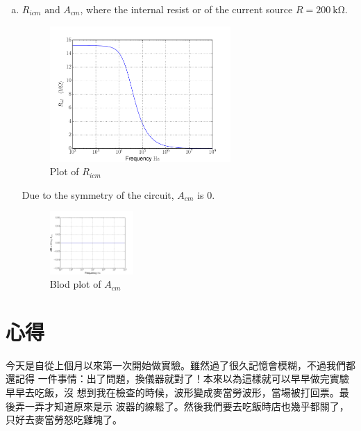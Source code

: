 \documentclass[12pt, a4paper]{article}
\begin{document}
\begin{enumerate}[itemsep=20pt, topsep=10pt]
\begin{enumerate}[(a)]
      \item $R_{icm} \text{ and } A_{cm}$, where the internal resist or of the current source $R=\SI{200}\kohm$.
        \begin{figure}[H]
          \centering
          \includegraphics[width=0.65\textwidth]{ngspice/acmr200_r.pdf}
          \caption{Plot of $R_{icm}$}
          \label{fig:}
        \end{figure}
        Due to the symmetry of the circuit, $A_{cm}$ is $0$.
        \begin{figure}[H]
          \centering
          \includegraphics[width=0.3\textwidth]{ngspice/acmr200_db.pdf}
          \caption{Blod plot of $A_{cm}$}
          \label{fig:}
        \end{figure}
    \end{enumerate}
\end{enumerate}

\section{心得}
今天是自從上個月以來第一次開始做實驗。雖然過了很久記憶會模糊，不過我們都還記得
一件事情：出了問題，換儀器就對了！本來以為這樣就可以早早做完實驗早早去吃飯，沒
想到我在檢查的時候，波形變成麥當勞波形，當場被打回票。最後弄一弄才知道原來是示
波器的線鬆了。然後我們要去吃飯時店也幾乎都關了，只好去麥當勞怒吃雞塊了。
\end{document}
